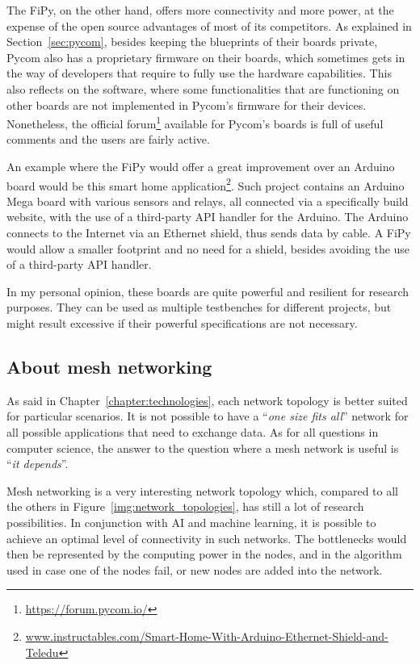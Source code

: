 			The FiPy, on the other hand, offers more connectivity and more power, at the expense of the open source advantages of most of its competitors.
			As explained in Section~\ref{sec:pycom}, besides keeping the blueprints of their boards private, Pycom also has a proprietary firmware on their boards, which sometimes gets in the way of developers that require to fully use the hardware capabilities.
			This also reflects on the software, where some functionalities that are functioning on other boards are not implemented in Pycom's firmware for their devices.
			Nonetheless, the official forum\footnote{ \url{https://forum.pycom.io/}} available for Pycom's boards is full of useful comments and the users are fairly active.
			
			An example where the FiPy would offer a great improvement over an Arduino board would be this smart home application\footnote{ \url{www.instructables.com/Smart-Home-With-Arduino-Ethernet-Shield-and-Teledu}}.
			Such project contains an Arduino Mega board with various sensors and relays, all connected via a specifically build website, with the use of a third-party API handler for the Arduino.
			The Arduino connects to the Internet via an Ethernet shield, thus sends data by cable.
			A FiPy would allow a smaller footprint and no need for a shield, besides avoiding the use of a third-party API handler.
					
			In my personal opinion, these boards are quite powerful and resilient for research purposes.
			They can be used as multiple testbenches for different projects, but might result excessive if their powerful specifications are not necessary.
			
		\subsection{About mesh networking}\label{sec:mesh_considerations}
			
			As said in Chapter~\ref{chapter:technologies}, each network topology is better suited for particular scenarios.
			It is not possible to have a ``\textit{one size fits all}'' network for all possible applications that need to exchange data.
			As for all questions in computer science, the answer to the question where a mesh network is useful is ``\textit{it depends}''.
			
			Mesh networking is a very interesting network topology which, compared to all the others in Figure~\ref{img:network_topologies}, has still a lot of research possibilities.
			In conjunction with AI and machine learning, it is possible to achieve an optimal level of connectivity in such networks.
			The bottlenecks would then be represented by the computing power in the nodes, and in the algorithm used in case one of the nodes fail, or new nodes are added into the network.

